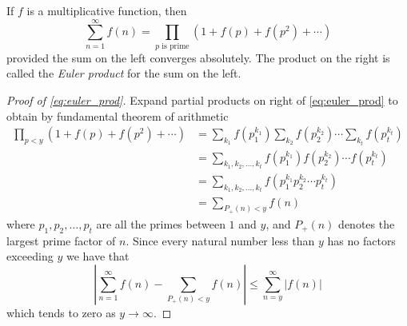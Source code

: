 \documentclass[12pt]{article}
\newcommand*{\abs}[1]{\left\lvert #1\right\rvert}
\begin{document}
If $f$ is a multiplicative function, then
\begin{equation}\label{eq:euler_prod}
\sum_{n=1}^\infty f(n)=
\prod_{p\text{ is prime}}(1+f(p)+f(p^2)+\dotsb)
\end{equation}
provided the sum on the left converges absolutely. The product
on the right is called the \emph{Euler product} for the sum on the
left.

\begin{proof}[Proof of \eqref{eq:euler_prod}]
Expand partial products on right of \eqref{eq:euler_prod} to
obtain by fundamental theorem of arithmetic
\begin{align*}
\prod_{p<y}(1+f(p)+f(p^2)+\dotsb)&=
\sum_{k_1}f(p_1^{k_1})\sum_{k_2}f(p_2^{k_2}) \dotsb\sum_{k_t}f(p_t^{k_t})\\
&=\sum_{k_1,k_2,\dotsc,k_t} f(p_1^{k_1})f(p_2^{k_2})\dotsb f(p_t^{k_t})\\
&=\sum_{k_1,k_2,\dotsc,k_t} f(p_1^{k_1}p_2^{k_2}\dotsb p_t^{k_t})\\
&=\sum_{P_+(n)<y} f(n)
\end{align*}
where $p_1,p_2,\dotsc,p_t$ are all the primes between $1$ and $y$, and $P_+(n)$ denotes the largest prime factor of $n$. Since
every natural number less than $y$ has no factors exceeding $y$ we have
that
\begin{equation*} \abs{\sum_{n=1}^\infty f(n)-\sum_{P_+(n)<y}
f(n)}\leq\sum_{n=y}^\infty \abs{f(n)}
\end{equation*}
which tends to zero as $y\to \infty$.
\end{proof}
\end{document}
